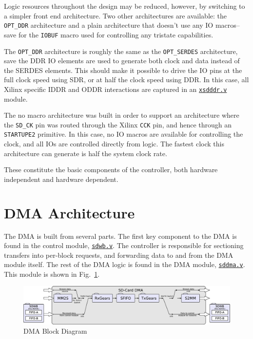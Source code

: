 \documentclass{gqtekspec}
\newcommand{\zhref}[2]{\href{#1}{\textcolor{dkblue}{#2}}}
\begin{document}
Logic resources throughout the design may be reduced, however, by switching
to a simpler front end architecture.  Two other architectures are available:
the {\tt OPT\_DDR} architecture and a plain architecture that doesn't use
any IO macros--save for the {\tt IOBUF} macro used for controlling any
tristate capabilities.

The {\tt OPT\_DDR} architecture is roughly the same as the {\tt OPT\_SERDES}
architecture, save the DDR IO elements are used to generate both clock and
data instead of the SERDES elements.  This should make it possible to drive
the IO pins at the full clock speed using SDR, or at half the clock speed
using DDR.  In this case, all Xilinx specific IDDR and ODDR interactions are
captured in an \zhref{../rtl/xsdddr.v}{\tt xsdddr.v} module.

The no macro architecture was built in order to support an architecture
where the {\tt SD\_CK} pin was routed through the Xilinx {\tt CCK} pin,
and hence through an {\tt STARTUPE2} primitive.  In this case, no IO macros
are available for controlling the clock, and all IOs are controlled directly
from logic.  The fastest clock this architecture can generate is half the
system clock rate.

These constitute the basic components of the controller, both hardware
independent and hardware dependent.
\section{DMA Architecture}\label{sec:arch-dma}
The DMA is built from several parts.  The first key component to the DMA is
found in the control module, \zhref{../rtl/sdwb.v}{\tt sdwb.v}.  The controller
is responsible for sectioning transfers into per-block requests, and forwarding
data to and from the DMA module itself.  The rest of the DMA logic is found
in the DMA module, \zhref{../rtl/sddma.v}{\tt sddma.v}.  This module is shown
in Fig.~\ref{fig:dmablocks}.
\begin{figure}\begin{center}
\includegraphics[width=5.0in]{gfx/dmablocks.eps}
\caption{DMA Block Diagram}\label{fig:dmablocks}
\end{center}\end{figure}
\end{document}
